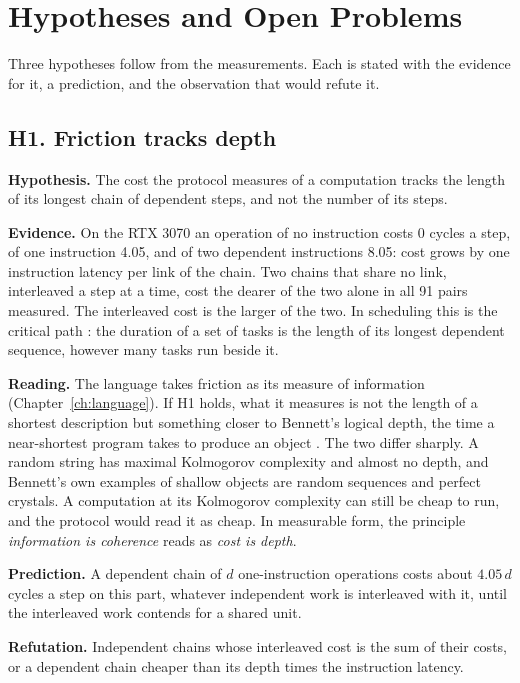 \chapter{Hypotheses and Open Problems}
\label{ch:hypotheses}

Three hypotheses follow from the measurements. Each is stated with the evidence for it, a
prediction, and the observation that would refute it.

\section{H1. Friction tracks depth}
\label{sec:h1}

\textbf{Hypothesis.} The cost the protocol measures of a computation tracks the length of its
longest chain of dependent steps, and not the number of its steps.

\textbf{Evidence.} On the RTX 3070 an operation of no instruction costs 0 cycles a step, of one
instruction 4.05, and of two dependent instructions 8.05: cost grows by one instruction latency
per link of the chain. Two chains that share no link, interleaved a step at a time, cost the
dearer of the two alone in all 91 pairs measured. The interleaved cost is the larger of the two. In
scheduling this is the critical path \cite{src:Kelley-Walker}: the duration of a set of tasks is
the length of its longest dependent sequence, however many tasks run beside it.

\textbf{Reading.} The language takes friction as its measure of information
(Chapter~\ref{ch:language}). If H1 holds, what it measures is not the length of a shortest
description but something closer to Bennett's logical depth, the time a near-shortest program
takes to produce an object \cite{src:Bennett}. The two differ sharply. A random string has
maximal Kolmogorov complexity and almost no depth, and Bennett's own examples of shallow objects
are random sequences and perfect crystals. A computation at its Kolmogorov complexity can still
be cheap to run, and the protocol would read it as cheap. In measurable form, the principle
\emph{information is coherence} reads as \emph{cost is depth}.

\textbf{Prediction.} A dependent chain of \(d\) one-instruction operations costs about
\(4.05\,d\) cycles a step on this part, whatever independent work is interleaved with it, until
the interleaved work contends for a shared unit.

\textbf{Refutation.} Independent chains whose interleaved cost is the sum of their costs, or a
dependent chain cheaper than its depth times the instruction latency.

